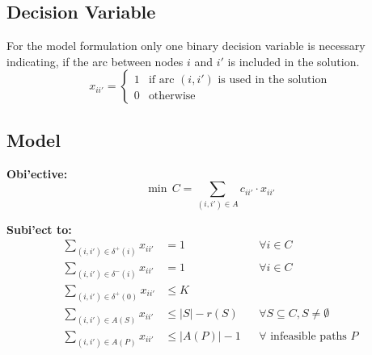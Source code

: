 \subsection*{Decision Variable}
For the model formulation only one binary decision variable is necessary indicating, if the arc
between nodes $i$ and $i'$ is included in the solution.
\[
    x_{ii'} =
    \begin{cases}
        1 & \text{if arc } (i,i') \text{ is used in the solution} \\
        0 & \text{otherwise}
    \end{cases}
\]
\clearpage

\subsection*{Model}
\textbf{Obi'ective:}
\begin{equation}
    \label{eq:obi'ective}
    \min \, C = \sum_{(i,i')\in A} c_{ii'}\cdot x_{ii'}
\end{equation}

\textbf{Subi'ect to:}
\begin{align}
    \sum_{(i,i')\in \delta^+(i)} x_{ii'} & = 1                                                                                  &  & \forall i \in C                         \label{eq:flowout}     \\
    \sum_{(i,i')\in \delta^-(i)} x_{ii'} & = 1                                                                                  &  & \forall i \in C                         \label{eq:flowin}      \\
    \sum_{(i,i')\in \delta^+(0)} x_{ii'} & \leq K                                                       \label{eq:vehiclelimit}                                                                     \\
    \sum_{(i,i')\in A(S)} x_{ii'}        & \leq |S| - r(S)                                                                      &  & \forall S \subseteq C, S \neq \emptyset \label{eq:capacitycut} \\
    \sum_{(i,i')\in A(P)} x_{ii'}        & \leq |A(P)| - 1                                                                      &  & \forall \text{ infeasible paths } P     \label{eq:pathelim}
\end{align}

